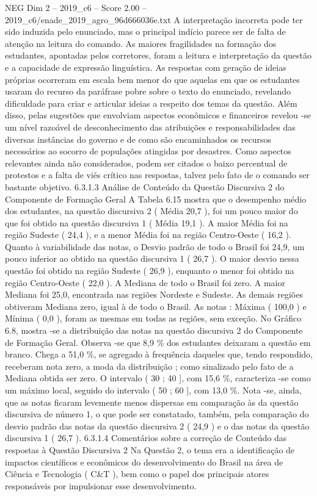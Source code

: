 \begin{textsample}{NEG Dim 2 – 2019\_c6 – Score 2.00 – 2019\_c6/enade\_2019\_agro\_96d666036e.txt}
A interpretação incorreta pode ter sido induzida pelo enunciado, mas o principal indício parece ser de falta de atenção na leitura do comando.
As maiores fragilidades na formação dos estudantes, apontadas pelos corretores, foram a leitura e interpretação da questão e a capacidade de expressão linguística.
As respostas com geração de ideias próprias ocorreram em escala bem menor do que aquelas em que os estudantes usaram do recurso da paráfrase pobre sobre o texto do enunciado, revelando dificuldade para criar e articular ideias a respeito dos temas da questão.
Além disso, pelas sugestões que envolviam aspectos econômicos e financeiros revelou -se um nível razoável de desconhecimento das atribuições e responsabilidades das diversas instâncias do governo e de como são encaminhados os recursos necessários ao socorro de populações atingidas por desastres.
Como aspectos relevantes ainda não considerados, podem ser citados o baixo percentual de protestos e a falta de viés crítico nas respostas, talvez pelo fato de o comando ser bastante objetivo. 6.3.1.3 Análise de Conteúdo da Questão Discursiva 2 do Componente de Formação Geral A Tabela 6.15 mostra que o desempenho médio dos estudantes, na questão discursiva 2 ( Média 20,7 ), foi um pouco maior do que foi obtido na questão discursiva 1 ( Média 19,1 ).
A maior Média foi na região Sudeste ( 24,4 ), e a menor Média foi na região Centro-Oeste ( 16,2 ).
Quanto à variabilidade das notas, o Desvio padrão de todo o Brasil foi 24,9, um pouco inferior ao obtido na questão discursiva 1 ( 26,7 ).
O maior desvio nessa questão foi obtido na região Sudeste ( 26,9 ), enquanto o menor foi obtido na região Centro-Oeste ( 22,0 ).
A Mediana de todo o Brasil foi zero.
A maior Mediana foi 25,0, encontrada nas regiões Nordeste e Sudeste.
As demais regiões obtiveram Mediana zero, igual à de todo o Brasil.
As notas : Máxima ( 100,0 ) e Mínima ( 0,0 ), foram as mesmas em todas as regiões, sem exceção.
No Gráfico 6.8, mostra -se a distribuição das notas na questão discursiva 2 do Componente de Formação Geral.
Observa -se que 8,9 \% dos estudantes deixaram a questão em branco.
Chega a 51,0 \%, se agregado à frequência daqueles que, tendo respondido, receberam nota zero, a moda da distribuição ; como sinalizado pelo fato de a Mediana obtida ser zero.
O intervalo ( 30 ; 40 ], com 15,6 \%, caracteriza -se como um máximo local, seguido do intervalo ( 50 ; 60 ], com 13,0 \%.
Nota -se, ainda, que as notas ficaram levemente menos dispersas em comparação às da questão discursiva de número 1, o que pode ser constatado, também, pela comparação do desvio padrão das notas da questão discursiva 2 ( 24,9 ) e o das notas da questão discursiva 1 ( 26,7 ). 6.3.1.4 Comentários sobre a correção de Conteúdo das respostas à Questão Discursiva 2 Na Questão 2, o tema era a identificação de impactos científicos e econômicos do desenvolvimento do Brasil na área de Ciência e Tecnologia ( C\&T ), bem como o papel dos principais atores responsáveis por impulsionar esse desenvolvimento.

\end{textsample}
